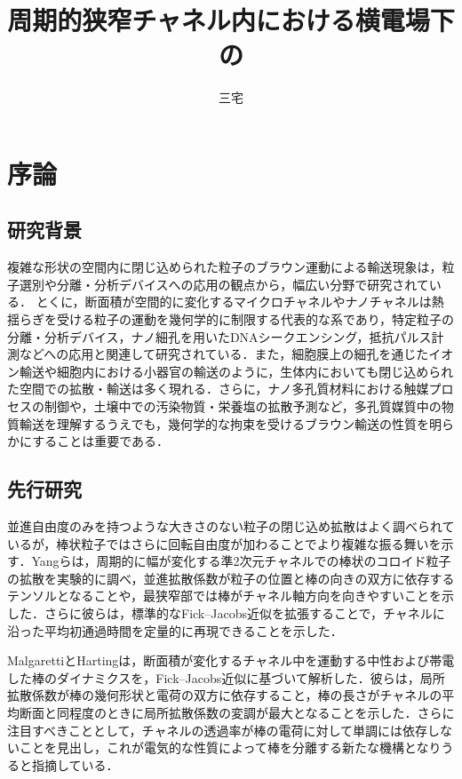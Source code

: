 \documentclass[dvipdfmx]{ampbt}
\title{周期的狭窄チャネル内における横電場下の}     %
      {誘電性棒状粒子のブラウン輸送の数値解析}     %
      {}                                     %
\author{三宅}{優希}                %
\begin{document}
\ifoutputbody
  \makeinsidecover                %
  \makeabstract                   %
  \maketoc                        %
  \setcounter{page}{1}            %
  \section{序論}

  \subsection{研究背景}
  複雑な形状の空間内に閉じ込められた粒子のブラウン運動による輸送現象は，粒子選別や分離・分析デバイスへの応用の観点から，幅広い分野で研究されている．
  とくに，断面積が空間的に変化するマイクロチャネルやナノチャネルは熱揺らぎを受ける粒子の運動を幾何学的に制限する代表的な系であり，特定粒子の分離・分析デバイス\cite{malgaretti2021}，ナノ細孔を用いたDNAシークエンシング\cite{bonthuis2008,sakaue2018}，抵抗パルス計測\cite{saleh2003,ito2004,heins2005,arjmandi2012}などへの応用と関連して研究されている．また，細胞膜上の細孔を通じたイオン輸送や細胞内における小器官の輸送のように，生体内においても閉じ込められた空間での拡散・輸送は多く現れる．さらに，ナノ多孔質材料における触媒プロセスの制御や，土壌中での汚染物質・栄養塩の拡散予測など，多孔質媒質中の物質輸送を理解するうえでも，幾何学的な拘束を受けるブラウン輸送の性質を明らかにすることは重要である\cite{malgaretti2021}．

  \subsection{先行研究}
  並進自由度のみを持つような大きさのない粒子の閉じ込め拡散はよく調べられているが，棒状粒子ではさらに回転自由度が加わることでより複雑な振る舞いを示す．Yangら\cite{yang2019}は，周期的に幅が変化する準2次元チャネルでの棒状のコロイド粒子の拡散を実験的に調べ，並進拡散係数が粒子の位置と棒の向きの双方に依存するテンソルとなることや，最狭窄部では棒がチャネル軸方向を向きやすいことを示した．さらに彼らは，標準的なFick--Jacobs近似を拡張することで，チャネルに沿った平均初通過時間を定量的に再現できることを示した．

  MalgarettiとHarting\cite{malgaretti2021}は，断面積が変化するチャネル中を運動する中性および帯電した棒のダイナミクスを，Fick--Jacobs近似に基づいて解析した．彼らは，局所拡散係数が棒の幾何形状と電荷の双方に依存すること，棒の長さがチャネルの平均断面と同程度のときに局所拡散係数の変調が最大となることを示した．さらに注目すべきこととして，チャネルの透過率が棒の電荷に対して単調には依存しないことを見出し，これが電気的な性質によって棒を分離する新たな機構となりうると指摘している．
\end{document}
